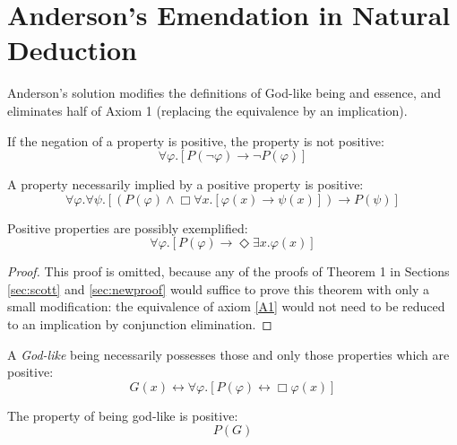 \documentclass[smallextended]{svjour3}
\newcommand{\imp}{\rightarrow}
\newcommand{\biimp}{\leftrightarrow}
\newcommand{\all}{\forall}
\newcommand{\ex}{\exists}
\newcommand{\nec}{\Box} %
\newcommand{\pos}{\Diamond} %
\begin{document}
\section{Anderson's Emendation in Natural Deduction}
\label{sec:anderson}


Anderson's solution \citep{and90} modifies the definitions of God-like being and essence, and eliminates half of Axiom 1 (replacing the equivalence by an implication).  





\setcounter{axiom}{0}
\setcounter{lemma}{0}
\setcounter{theorem}{0}
\setcounter{corollary}{0}
\setcounter{definition}{0}

\begin{axiom}[Emended]
\label{A:A1}
If the negation of a property is positive, the property is not positive:
$$
\all \varphi. [P(\neg \varphi) \imp \neg P(\varphi)]
$$
\end{axiom}

\begin{axiom}[As in Scott's]
\label{A:A2}
A property necessarily implied by a positive property is positive:
$$
\all \varphi. \all \psi.[(P(\varphi) \wedge \nec \all x.[\varphi(x) \imp \psi(x)]) \imp P(\psi)]
$$
\end{axiom}


\begin{theorem}
\label{A:T1}
Positive properties are possibly exemplified:
$$
\all \varphi. [P(\varphi) \imp \pos \ex x.\varphi(x)]
$$
\end{theorem}
\begin{proof}
This proof is omitted, because any of the proofs of Theorem 1 in Sections \ref{sec:scott} and \ref{sec:newproof} would suffice to prove this theorem with only a small modification: the equivalence of axiom \ref{A1} would not need to be reduced to an implication by conjunction elimination. 
\end{proof}



\begin{definition}[Emended]
\label{A:D1}
A \emph{God-like} being necessarily possesses those and only those properties which are positive:
$$
G(x) \biimp \forall \varphi. [P(\varphi) \biimp \nec \varphi(x)]
$$
\end{definition}

\begin{axiom}[As in Scott's]
\label{A:A3}
The property of being god-like is positive:
$$
P(G)
$$
\end{axiom}
\end{document}
